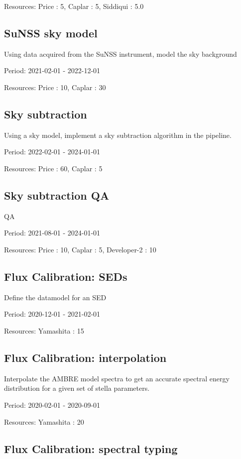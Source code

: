 Resources: Price : 5, Caplar : 5, Siddiqui : 5.0

\subsection{SuNSS sky model}

Using data acquired from the SuNSS instrument, model the sky background

Period: 2021-02-01 - 2022-12-01

Resources: Price : 10, Caplar : 30

\subsection{Sky subtraction}

Using a sky model, implement a sky subtraction algorithm in the pipeline.

Period: 2022-02-01 - 2024-01-01

Resources: Price : 60, Caplar : 5

\subsection{Sky subtraction QA}

QA

Period: 2021-08-01 - 2024-01-01

Resources: Price : 10, Caplar : 5, Developer-2 : 10

\subsection{Flux Calibration: SEDs}

Define the datamodel for an SED

Period: 2020-12-01 - 2021-02-01

Resources: Yamashita : 15

\subsection{Flux Calibration: interpolation}

Interpolate the AMBRE model spectra to get an accurate spectral energy distribution for a given set of stella parameters.

Period: 2020-02-01 - 2020-09-01

Resources: Yamashita : 20

\subsection{Flux Calibration: spectral typing}

